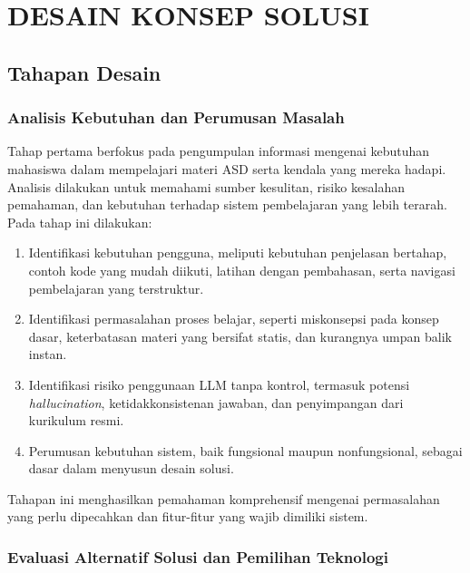 \chapter{DESAIN KONSEP SOLUSI}
\label{chap:desain-konsep-solusi}
\section{Tahapan Desain}

\subsection{Analisis Kebutuhan dan Perumusan Masalah}

Tahap pertama berfokus pada pengumpulan informasi mengenai kebutuhan
mahasiswa dalam mempelajari materi ASD serta kendala yang mereka hadapi.
Analisis dilakukan untuk memahami sumber kesulitan, risiko kesalahan
pemahaman, dan kebutuhan terhadap sistem pembelajaran yang lebih terarah.
Pada tahap ini dilakukan:

\begin{enumerate}
    \item Identifikasi kebutuhan pengguna, meliputi kebutuhan penjelasan bertahap,
    contoh kode yang mudah diikuti, latihan dengan pembahasan, serta navigasi
    pembelajaran yang terstruktur.

    \item Identifikasi permasalahan proses belajar, seperti miskonsepsi pada konsep
    dasar, keterbatasan materi yang bersifat statis, dan kurangnya umpan balik instan.

    \item Identifikasi risiko penggunaan LLM tanpa kontrol, termasuk potensi
    \textit{hallucination}, ketidakkonsistenan jawaban, dan penyimpangan dari
    kurikulum resmi.

    \item Perumusan kebutuhan sistem, baik fungsional maupun nonfungsional,
    sebagai dasar dalam menyusun desain solusi.
\end{enumerate}

Tahapan ini menghasilkan pemahaman komprehensif mengenai permasalahan yang
perlu dipecahkan dan fitur-fitur yang wajib dimiliki sistem.


\subsection{Evaluasi Alternatif Solusi dan Pemilihan Teknologi}


